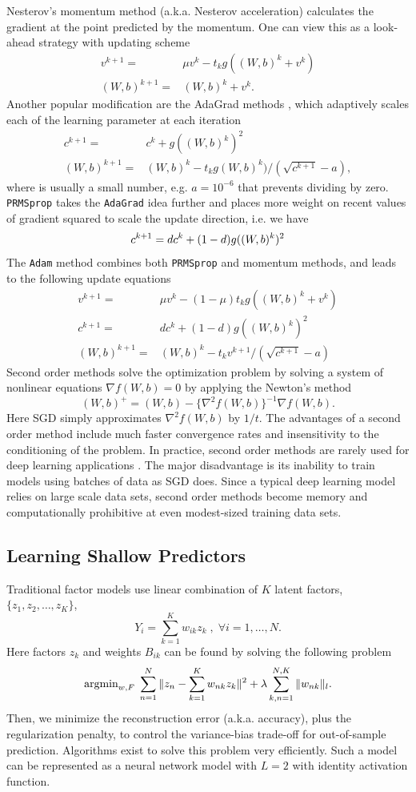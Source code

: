 \documentclass[12pt]{article}
\begin{document}
Nesterov's momentum method (a.k.a. Nesterov acceleration) calculates the gradient at the point predicted by the momentum. One can view this as a look-ahead strategy with updating scheme
\begin{align*}
v^{k+1} = & \mu v^k - t_k g((W,b)^k +v^k)\\
(W,b)^{k+1} = & (W,b)^k +v^k.
\end{align*}
Another popular modification are the AdaGrad methods \cite{zeiler2012adadelta}, which adaptively scales each of the learning parameter at each iteration 
\begin{align*}
c^{k+1} = &      c^k + g((W,b)^k)^2\\
(W,b)^{k+1} = & (W,b)^k - t_k g(W,b)^k)/(\sqrt{c^{k+1}} - a),
\end{align*}
where is usually a small number, e.g. $a = 10^{-6}$ that prevents dividing by zero. {\tt PRMSprop} takes the {\tt AdaGrad} idea further and places more weight on recent values of gradient squared to scale the update direction, i.e. we have 
\[
c^{k+1} =  dc^k + (1-d)g((W,b)^k)^2\\
\]
The {\tt Adam} method \citep{kingma2014adam} combines both {\tt PRMSprop} and momentum methods, and leads to the following update equations
\begin{align*}
v^{k+1} = & \mu v^k - (1-\mu)t_k g((W,b)^k +v^k)\\
c^{k+1} = & dc^k + (1-d)g((W,b)^k)^2\\
(W,b)^{k+1} = & (W,b)^k - t_k v^{k+1}/(\sqrt{c^{k+1}} - a) 
\end{align*}
Second order methods solve the optimization problem by solving a system of nonlinear equations $\nabla f(W,b) = 0$ by applying the Newton's method
\[
(W,b)^+ = (W,b) - \{ \nabla^2f(W,b) \}^{-1}\nabla f(W,b).
\]
Here SGD simply approximates $\nabla^2f(W,b)$ by $1/t$. The advantages of a second order method include much faster convergence rates and insensitivity to the conditioning of the problem. In practice, second order methods are rarely used for deep learning applications \citep{dean2012}. The major disadvantage is its inability to train models using batches of data as SGD does. Since a typical deep learning model relies on large scale data sets, second order methods become memory and computationally prohibitive at even modest-sized training data sets.


\subsection{Learning Shallow Predictors}
Traditional factor models use linear combination of $K$ latent factors, $\{ z_1 , z_2 , \ldots , z_K \} $, 
\[
Y_i = \sum_{k=1}^K w_{ik} z_k \; , \; \forall i = 1 , \ldots , N.
\]
Here factors $z_k$ and weights $B_{ik}$ can be found by solving the following problem
\[
{\rm arg min}_{ w , F} \; \sum_{n=1}^N \Vert z_n - \sum_{k=1}^K w_{nk} z_k \Vert^2 + \lambda \sum_{k,n=1}^{N,K} \Vert w_{nk} \Vert_l.
\]
Then, we minimize the reconstruction error (a.k.a. accuracy), plus the regularization penalty, to control the variance-bias trade-off for out-of-sample prediction. Algorithms exist to solve this problem very efficiently. Such a model can be represented as a neural network model with $L=2$ with identity activation function. 
\end{document}
